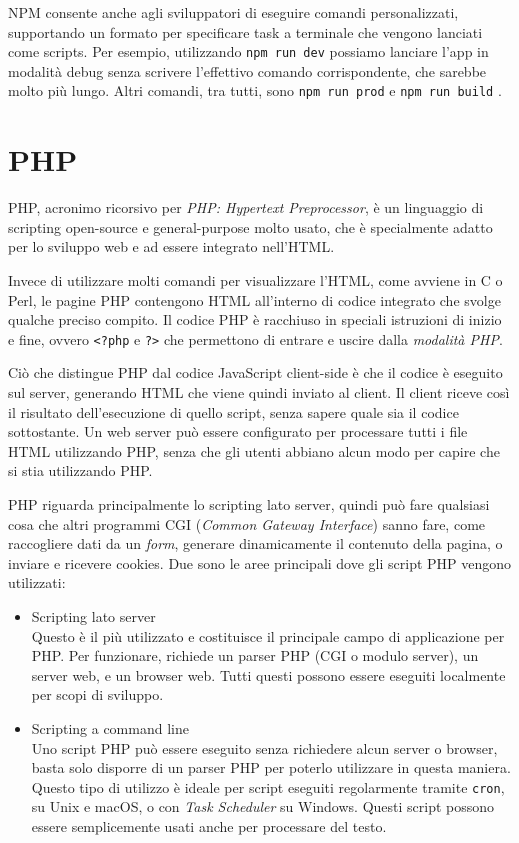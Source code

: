 NPM consente anche agli sviluppatori di eseguire comandi personalizzati, supportando un formato per specificare task a terminale che vengono lanciati come scripts. Per esempio, utilizzando \Verb_npm run dev_ possiamo lanciare l'app in modalità debug senza scrivere l'effettivo comando corrispondente, che sarebbe molto più lungo. Altri comandi, tra tutti, sono \Verb_npm run prod_ e \Verb_npm run build_ \cite{NPM_Package_Manager}.

\section{PHP}
PHP, acronimo ricorsivo per \textit{PHP: Hypertext Preprocessor}, è un linguaggio di scripting open-source e general-purpose molto usato, che è specialmente adatto per lo sviluppo web e ad essere integrato nell'HTML.

Invece di utilizzare molti comandi per visualizzare l'HTML, come avviene in C o Perl, le pagine PHP contengono HTML all'interno di codice integrato che svolge qualche preciso compito. Il codice PHP è racchiuso in speciali istruzioni di inizio e fine, ovvero \Verb_<?php_ e \Verb_?>_ che permettono di entrare e uscire dalla \textit{modalità PHP}.

Ciò che distingue PHP dal codice JavaScript client-side è che il codice è eseguito sul server, generando HTML che viene quindi inviato al client. Il client riceve così il risultato dell'esecuzione di quello script, senza sapere quale sia il codice sottostante. Un web server può essere configurato per processare tutti i file HTML utilizzando PHP, senza che gli utenti abbiano alcun modo per capire che si stia utilizzando PHP.

PHP riguarda principalmente lo scripting lato server, quindi può fare qualsiasi cosa che altri programmi CGI (\textit{Common Gateway Interface}) sanno fare, come raccogliere dati da un \textit{form}, generare dinamicamente il contenuto della pagina, o inviare e ricevere cookies. Due sono le aree principali dove gli script PHP vengono utilizzati:
\begin{itemize}
    \item Scripting lato server\\
    Questo è il più utilizzato e costituisce il principale campo di applicazione per PHP. Per funzionare, richiede un parser PHP (CGI o modulo server), un server web, e un browser web. Tutti questi possono essere eseguiti localmente per scopi di sviluppo.
    \item Scripting a command line\\
    Uno script PHP può essere eseguito senza richiedere alcun server o browser, basta solo disporre di un parser PHP per poterlo utilizzare in questa maniera. Questo tipo di utilizzo è ideale per script eseguiti regolarmente tramite \Verb_cron_, su Unix e macOS, o con \textit{Task Scheduler} su Windows. Questi script possono essere semplicemente usati anche per processare del testo.
\end{itemize}

